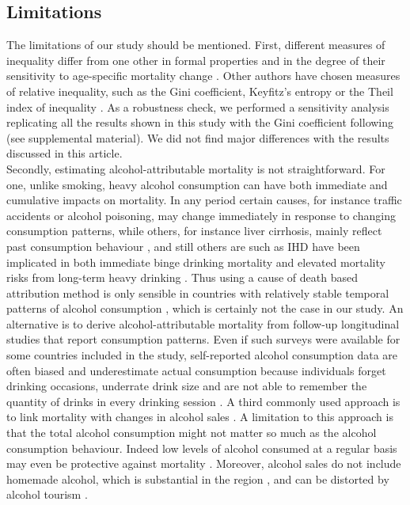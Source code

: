 \documentclass{article}
\begin{document}
\begin{spacing}{1.5}
\subsection*{Limitations} 
The limitations of our study should be mentioned. First, different measures of inequality differ from one other in formal properties and in the degree of their sensitivity to age-specific mortality change \citep{vanraalte2013}. Other authors have chosen measures of relative inequality, such as the Gini coefficient, Keyfitz's entropy or the Theil index of inequality \citep{shkolnikov2003,moser2005world,smits2009,colchero2016emergence}. As a robustness check, we performed a sensitivity analysis replicating all the results shown in this study with the Gini coefficient following \citet{shkolnikov2003} (see supplemental material). We did not find major differences with the results discussed in this article. \\

Secondly, estimating alcohol-attributable mortality is not straightforward. For one, unlike smoking, heavy alcohol consumption can have both immediate and cumulative impacts on mortality. In any period certain causes, for instance traffic accidents or alcohol poisoning, may change immediately in response to changing consumption patterns, while others, for instance liver cirrhosis, mainly reflect past consumption behaviour \citep{ menon2001pathogenesis, rehm2003relationship}, and still others are such as IHD have been implicated in both immediate binge drinking mortality \citep{kauhanen1997beer} and elevated mortality risks from long-term heavy drinking \citep{roerecke2014alcohol}. Thus using a cause of death based attribution method is only sensible in countries with relatively stable temporal patterns of alcohol consumption \citep{kraus2015changes,martikainen2014income}, which is certainly not the case in our study. An alternative is to derive alcohol-attributable mortality from follow-up longitudinal studies that report consumption patterns. Even if such surveys were available for some countries included in the study, self-reported alcohol consumption data are often biased and underestimate actual consumption because individuals forget drinking occasions, underrate drink size and are not able to remember the quantity of drinks in every drinking session \citep{livingston2015underreporting,bellis2009off}. A third commonly used approach is to link mortality with changes in alcohol sales \citep{ evgeny2010beverage}. A limitation to this approach is that the total alcohol consumption might not matter so much as the alcohol consumption behaviour. Indeed low levels of alcohol consumed at a regular basis may even be protective against mortality \citep{bell2017,rehm2010relation, klatsky1974alcohol, roerecke2014alcohol}. Moreover, alcohol sales do not include homemade alcohol, which is substantial in the region \citep{popova2007comparing,mckee2005composition}, and can be distorted by alcohol tourism \citep{makela2009weakening,rabinovich2009affordability}. \\


\end{spacing}
\end{document}
